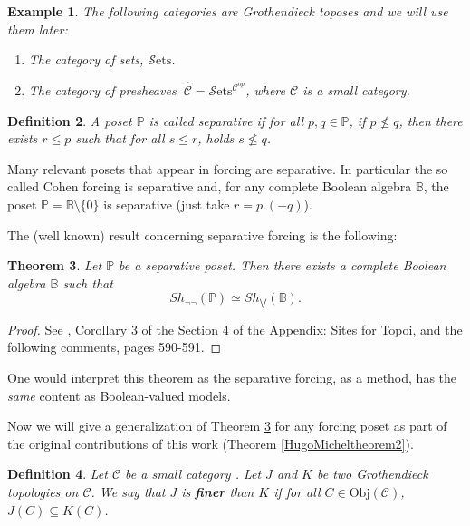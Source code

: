 \documentclass[10pt,longbibliography]{article}
\newtheorem{Theo}{Theorem}[section]
\newtheorem{Def}[Theo]{Definition}
\newtheorem{Ex}[Theo]{Example}
\newcommand{\C}{\mathcal{C}}
\newcommand{\Sets}{\mathcal{S}\text{ets}}
\newcommand{\Po}{\mathbb{P}}
\newcommand{\B}{\mathbb{B}}
\begin{document}
\begin{Ex}
	The following categories are Grothendieck toposes and we will use them later:
	\begin{enumerate}
		\item The category of sets, $\Sets$.
		\item The category of presheaves $~\widehat{\C} = \Sets^{\C^{op}}$, where $\C$ is a small category.
	\end{enumerate}
\end{Ex}


\begin{Def}\label{separativeposet}
    A poset $\Po$ is called separative if for all $p, q \in \Po$, if $p \nleq q$, then there exists $r \leq p$ such that for all $s \leq r$, holds $s \nleq q$.
\end{Def}


 Many relevant posets that appear in  forcing are separative. In particular the so called Cohen forcing is separative and, for any complete Boolean algebra $\B$, the poset $\Po = \B \setminus \{0\}$ is separative (just take $r = p . (- q)$).

The (well known) result concerning separative forcing is the following:



 
    
    


\begin{Theo}\label{equivalenceofcategoriesdensemorphismseparative}
	Let $\Po$ be a separative poset. Then there exists a complete Boolean algebra $\mathbb{B}$ such that 
	$$Sh_{\neg \neg}(\Po) \simeq Sh_{\bigvee}(\mathbb{B}).$$
\end{Theo}
\begin{proof}
See \cite{MacMoe94},  Corollary 3 of the Section 4 of the Appendix: Sites for Topoi, and the following comments, pages 590-591.
\end{proof}

One would interpret this theorem as the separative forcing, as a method, has the \emph{same} content as Boolean-valued models. 

Now we will give a generalization of Theorem \ref{equivalenceofcategoriesdensemorphismseparative} for any forcing poset as part of the original contributions of this work (Theorem \ref{HugoMicheltheorem2}).




\begin{Def}
	Let $\C$ be a small category . Let $J$ and $K$ be two Grothendieck topologies on $\C$. We say that $J$ is \textbf{finer} than $K$ if for all $C \in \text{Obj}(\C)$, $J(C)\subseteq K(C)$.
\end{Def}
\end{document}
